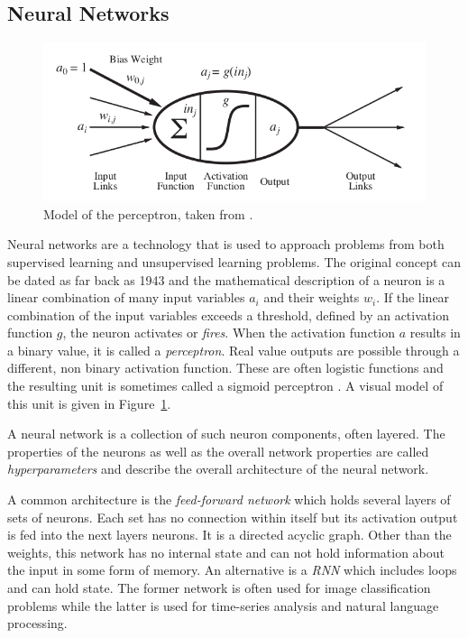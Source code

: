 \subsection{Neural Networks}%
\label{sec:neural_networks}


\begin{figure}[b]
    \centering
    \includegraphics[width=0.8\linewidth]{img/perceptron.png}
    \caption{Model of the perceptron, taken from \citep{russell2016artificial}.}
    \label{fig:perceptron}
\end{figure}

Neural networks are a technology that is used to approach problems from both supervised learning and unsupervised learning problems. The original
concept can be dated  as far back as 1943 \cite[p.727]{russell2016artificial} and the mathematical description of a
neuron is a linear combination of many input variables $a_i$ and their weights $w_i$. If the linear combination of the
input variables exceeds a threshold, defined by an activation function $g$, the neuron activates or \emph{fires}. When
the activation function $a$ results in a binary value, it is called a \emph{perceptron}. Real value outputs are possible
through a different, non binary activation function. These are often logistic functions and the resulting unit is
sometimes called a sigmoid perceptron \cite[p.729]{russell2016artificial}. A visual model of this unit
is given in Figure~\ref{fig:perceptron}.


A neural network  is a collection of such neuron components, often layered. The properties of the neurons as well
as the overall network properties are called \emph{hyperparameters} and describe the overall architecture of the neural network.

A common architecture is the \emph{feed-forward network} which holds several layers of sets of neurons. Each set has no
connection within itself but its activation output is fed into the next layers neurons. It is a directed
acyclic graph. Other than the weights, this network has no internal state and can not hold information about
the input in some form of memory. An alternative is a \emph{\acl {RNN} } which includes loops and can
hold state. The former network is often used for image classification problems while the latter is used for
time-series analysis and natural language processing.

